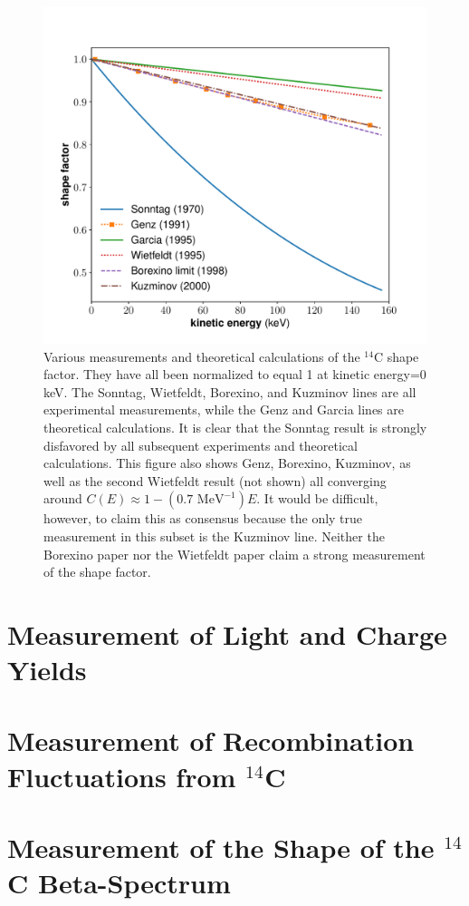\begin{figure}[h!]
\centering
\includegraphics[width=\textwidth]{Figures/ShapeFac_compare.pdf}
\caption{Various measurements and theoretical calculations of the $^{14}$C shape factor. They have all been normalized to equal 1 at kinetic energy=0 keV. The Sonntag\cite{C14_Sonntag}, Wietfeldt\cite{C14_Wietfeldt}, Borexino\cite{C14_Borexino}, and Kuzminov\cite{C14_Kuzminov} lines are all experimental measurements, while the Genz\cite{C14_Genz} and Garcia\cite{C14_Garcia} lines are theoretical calculations. It is clear that the Sonntag result is strongly disfavored by all subsequent experiments and theoretical calculations. This figure also shows Genz, Borexino, Kuzminov, as well as the second Wietfeldt result (not shown) all converging around $C(E)\approx 1-(0.7 \text{ \ MeV}^{-1})E$. It would be difficult, however, to claim this as consensus because the only true measurement in this subset is the Kuzminov line. Neither the Borexino paper nor the Wietfeldt paper claim a strong measurement of the shape factor.} 
\label{fig:C14_shape}
\end{figure}



\section{Measurement of Light and Charge Yields}




\section{Measurement of Recombination Fluctuations from $^{14}$C}









\section{Measurement of the Shape of the $^{14}$C Beta-Spectrum}


















